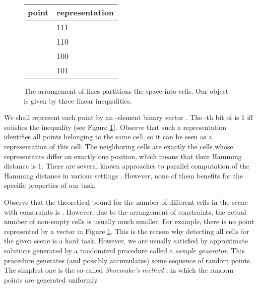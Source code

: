 \documentclass[a4paper]{article}
\begin{document}
\begin{figure}[htb]
\small
\begin{center}
\raisebox{-30pt}
{
}
\hskip 1cm
\begin{tabular}{l | l}
point & representation \\ \hline
 & 111 \\
 & 110 \\
 & 100 \\
 & 101
\end{tabular}
\end{center}
\caption{The arrangement of lines partitions the space into cells. Our object is given by three linear inequalities.
}
\label{fig-lines}
\end{figure}

We shall represent each point  by an -element binary vector . The -th bit of  is 1 iff  satisfies the inequality  (see Figure \ref{fig-lines}). 
Observe that such a representation identifies all points belonging to the same cell, so it can be seen as a representation of this cell. The neighboring cells are exactly the cells whose representants differ on exactly one position, which means that their Hamming distance is 1.
There are several known approaches to parallel computation of the Hamming distance in various settings \cite{DBLP:conf/ipps/LiuGLRL12, DBLP:conf/iros/PanLM10, Grabowski2008182}. However, none of them benefits for the specific properties of our task.





Observe that the theoretical bound for the number of different cells in the scene with  constraints is . However, due to the arrangement of constraints, the actual number of non-empty cells is usually much smaller. For example, there is no point represented by a vector  in Figure \ref{fig-lines}.
This is the reason why detecting all cells for the given scene is a hard task. However, we are usually satisfied by approximate solutions generated by a randomized procedure called a {\em sample generator}. This procedure generates (and possibly accumulates) some sequence of random points. The simplest one is the so-called {\em Shoemake's method} \cite{Shoemake:1992:URR:130745.130769}, in which the random points are generated uniformly.
\end{document}
